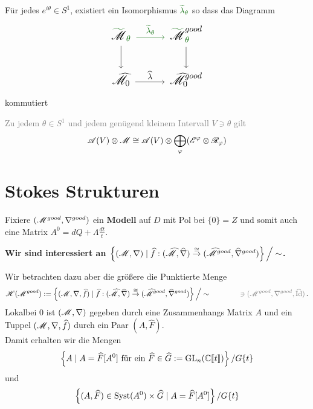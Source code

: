 \begin{paracol}{2} %
  \begin{thm}
    Für jedes $e^{i\theta}\in S^1$, existiert ein Isomorphismus
    $\textcolor{green!40!black}{\tilde\lambda_\theta}$ so dass das Diagramm
    \[ \Large\begin{tikzcd}
        \textcolor{green!40!black}{\tilde{\textcolor{black}{\sM}}_\theta}
        \dar \rar[green!40!black]{\tilde\lambda_\theta}&
        \textcolor{green!40!black}{%
        \tilde{\textcolor{black}{\sM}}_\theta^{\textcolor{black}{good}}}\dar
        \\\hat\sM_0 \rar{\hat\lambda} &
        \hat\sM_0^{good}
    \end{tikzcd} \]
    kommutiert
  \end{thm}
\switchcolumn %
\begin{thm}
  \textcolor{gray}{%
    Zu jedem $\theta\in S^1$ und jedem genügend kleinem Intervall $V\ni\theta$
    gilt
    \[
      \mathscr{A}(V)\otimes\mathscr{M}\cong\mathscr{A}(V)\otimes\bigoplus_\varphi(\mathscr{E}^\varphi\otimes\mathscr{R}_\varphi)
    \]
  }
\end{thm}
\end{paracol} %
\section{Stokes Strukturen} %
Fixiere $(\mathscr{M}^{good},\nabla^{good})$ ein \textbf{Modell} auf $D$ mit Pol bei
$\{0\}=Z$ und somit auch eine Matrix $A^0=dQ+\Lambda\frac{dt}{t}$.

\begin{center}
  \textbf{Wir sind interessiert an
    $\left\{(\mathscr{M},\nabla)
        \mid \widehat f:(\widehat{\mathscr{M}},\widehat\nabla)
          \overset{\cong}\to
          (\widehat{\mathscr{M}}^{good},\widehat\nabla^{good})
      \right\}\Big/\sim$.}
\end{center}
Wir betrachten dazu aber die größere die Punktierte Menge 
\[
  \sH(\sM^{good}):=\left\{(\sM,\nabla,\hat f)
      \mid \hat f:(\hat\sM,\hat\nabla)
        \overset{\cong}\to
        (\hat\sM^{good},\hat\nabla^{good})
    \right\}\Big/\sim
    \qquad \qquad
    \textcolor{gray}{\ni (\sM^{good},\nabla^{good},\hat \Id)}\,.
\]
Lokal\TODO[am Halm] bei $0$ ist $(\mathscr{M},\nabla)$ gegeben durch eine
Zusammenhangs Matrix $A$ und ein Tuppel $(\mathscr{M},\nabla,\widehat f)$ durch ein Paar
$(A,\hat F)$.
\\Damit erhalten wir die Mengen
\[
  \left\{A \mid A=\widehat F[A^0]\text{ für ein }\widehat F\in\widehat G
    :=\operatorname{GL}_n(\mathbb{C}\llbracket t\rrbracket)\right\}/G\{t\}
\]
und
\[
  \left\{(A,\widehat F)\in\operatorname{Syst}(A^0)\times\widehat G\mid A=\widehat F[A^0]\right\}/G\{t\}
\]

